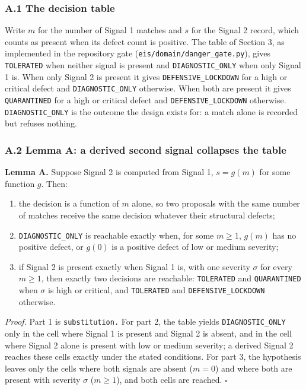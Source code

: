 \documentclass[
  11pt,
]{article}
\newcommand{\passthrough}[1]{#1}
\providecommand{\tightlist}{%
  \setlength{\itemsep}{0pt}\setlength{\parskip}{0pt}}
\begin{document}
\subsubsection{A.1 The decision table}\label{a.1-the-decision-table}

Write \(m\) for the number of Signal 1 matches and \(s\) for the Signal
2 record, which counts as present when its defect count is positive. The
table of Section 3, as implemented in the repository gate
(\nolinkurl{eis/domain/danger_gate.py}),
gives \passthrough{\lstinline!TOLERATED!} when neither signal is present
and \nolinkurl{DIAGNOSTIC_ONLY} when only Signal 1 is. When only Signal
2 is present it gives \nolinkurl{DEFENSIVE_LOCKDOWN} for a high or
critical defect and \nolinkurl{DIAGNOSTIC_ONLY} otherwise. When both are
present it gives \passthrough{\lstinline!QUARANTINED!} for a high or
critical defect and \nolinkurl{DEFENSIVE_LOCKDOWN} otherwise.
\nolinkurl{DIAGNOSTIC_ONLY} is the outcome the design exists for: a
match alone is recorded but refuses nothing.

\subsubsection{A.2 Lemma A: a derived second signal collapses the
table}\label{a.2-lemma-a-a-derived-second-signal-collapses-the-table}

\textbf{Lemma A.} Suppose Signal 2 is computed from Signal 1,
\(s = g(m)\) for some function \(g\). Then:

\begin{enumerate}
\def\labelenumi{\arabic{enumi}.}
\tightlist
\item
  the decision is a function of \(m\) alone, so two proposals with the
  same number of matches receive the same decision whatever their
  structural defects;
\item
  \nolinkurl{DIAGNOSTIC_ONLY} is reachable exactly when, for some
  \(m \geq 1\), \(g(m)\) has no positive defect, or \(g(0)\) is a
  positive defect of low or medium severity;
\item
  if Signal 2 is present exactly when Signal 1 is, with one severity
  \(\sigma\) for every \(m \geq 1\), then exactly two decisions are
  reachable: \passthrough{\lstinline!TOLERATED!} and
  \passthrough{\lstinline!QUARANTINED!} when \(\sigma\) is high or
  critical, and \passthrough{\lstinline!TOLERATED!} and
  \nolinkurl{DEFENSIVE_LOCKDOWN} otherwise.
\end{enumerate}

\emph{Proof.} Part 1 is \nolinkurl{substitution.} For part 2, the table
yields \nolinkurl{DIAGNOSTIC_ONLY} only in the cell where Signal 1 is
present and Signal 2 is absent, and in the cell where Signal 2 alone is
present with low or medium severity; a derived Signal 2 reaches these
cells exactly under the stated conditions. For part 3, the hypothesis
leaves only the cells where both signals are absent (\(m = 0\)) and
where both are present with severity \(\sigma\) (\(m \geq 1\)), and both
cells are reached. \(\square\)
\end{document}
